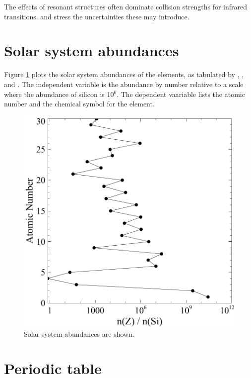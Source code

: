 The effects of resonant structures often dominate collision strengths
for infrared transitions.
\citet{Oliva1996} and \citet{VanHoof2000a} stress the uncertainties these may introduce.

\section{Solar system abundances}

Figure \ref{fig:SolarSystemAbundances} plots the solar system abundances of the elements, as tabulated
by \citet{Allende2001}, \citet{Allende2002},
\citet{Holweger2001} and \citet{Grevesse1998}.
The independent variable is the abundance by number relative to a scale where
the abundance of silicon is 10$^6$.  The dependent vaariable lists the atomic number and
the chemical symbol for the element.

\begin{figure}
\centering
\label{fig:SolarSystemAbundances}
\includegraphics[scale=0.7]{SolarSystemAbundances}
\caption[Solar system abundances]{Solar system abundances are shown.}
\end{figure}

\section{Periodic table}

